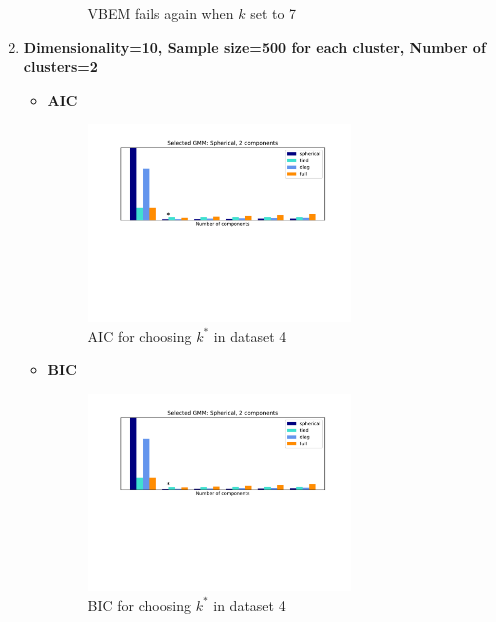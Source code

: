 \documentclass[12pt,a4paper,UTF8,fntef]{article}
\begin{document}
\begin{enumerate}
\begin{itemize}
\begin{figure}[!h]
		\caption{VBEM fails again when $k$ set to 7}
	\end{figure}
\end{itemize}
\item \textbf{Dimensionality=10, Sample size=500 for each cluster, Number of clusters=2}
\begin{itemize}
	\item \textbf{AIC}
	\begin{figure}[!h]
		\centering
		\includegraphics[width=0.7\textwidth]{AIC_4.pdf}
		\caption{AIC for choosing $k^*$ in dataset 4}
	\end{figure}
	\item \textbf{BIC}
	\begin{figure}[!h]
		\centering
		\includegraphics[width=0.7\textwidth]{BIC_4.pdf}
		\caption{BIC for choosing $k^*$ in dataset 4}
	\end{figure}
	

\end{itemize}
\end{enumerate}
\end{document}
